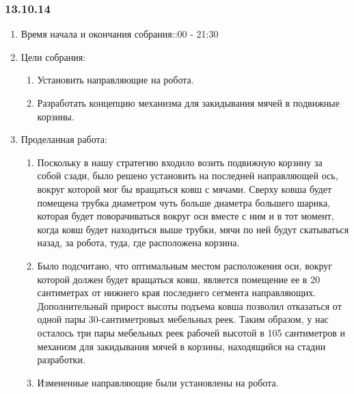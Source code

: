 
\subsubsection{13.10.14}

\begin{enumerate}
	\item Время начала и окончания собрания::00 - 21:30
	\item Цели собрания:\newline
	\begin{enumerate}
	  \item Установить направляющие на робота.\newline
	  
	  \item Разработать концепцию механизма для закидывания мячей в подвижные корзины.\newline
	  
    \end{enumerate}
	\item Проделанная работа:\newline
	\begin{enumerate}
	  \item Поскольку в нашу стратегию входило возить подвижную корзину за собой сзади, было решено установить на последней направляющей ось, вокруг которой мог бы вращаться ковш с мячами. Сверху ковша будет помещена трубка диаметром чуть больше диаметра большего шарика, которая будет поворачиваться вокруг оси вместе с ним и в тот момент, когда ковш будет находиться выше трубки, мячи по ней будут скатываться назад, за робота, туда, где расположена корзина.\newline
      
      \item  Было подсчитано, что оптимальным местом расположения оси, вокруг которой должен будет вращаться ковш, является помещение ее в 20 сантиметрах от нижнего края последнего сегмента направляющих. Дополнительный прирост высоты подъема ковша позволил отказаться от одной пары 30-сантиметровых мебельных реек. Таким образом, у нас осталось три пары мебельных реек рабочей высотой в 105 сантиметров и механизм для закидывания мячей в корзины, находящийся на стадии разработки.\newline
      
      \item  Измененные направляющие были установлены на робота.\newline
      

\end{enumerate}
\end{enumerate}

